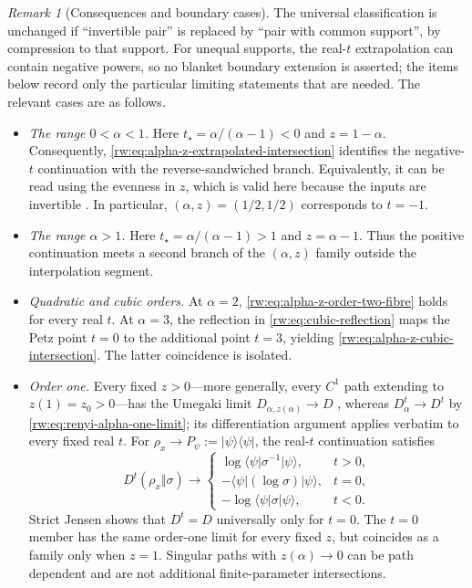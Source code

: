 \documentclass[11pt]{article}
\theoremstyle{remark}
\newtheorem{remark}[remark]{Remark}
\newcommand{\1}{\mathbbm{1}}
\begin{document}
\begin{remark}[Consequences and boundary cases]
\label{rw:rem:alpha-z-boundaries}
The universal classification is unchanged if ``invertible pair'' is
replaced by ``pair with common support'', by compression to that
support.  For unequal supports, the real-$t$ extrapolation can contain
negative powers, so no blanket boundary extension is asserted; the
items below record only the particular limiting statements that are
needed.
The relevant cases are as follows.
\begin{itemize}[leftmargin=1.5em,itemsep=2pt,parsep=0pt,topsep=4pt]
 \item \emph{The range $0<\alpha<1$.}
 Here $t_\star=\alpha/(\alpha-1)<0$ and $z=1-\alpha$.
 Consequently, \eqref{rw:eq:alpha-z-extrapolated-intersection}
 identifies the negative-$t$ continuation with the
 reverse-sandwiched branch.  Equivalently, it can be read using the
 evenness in $z$, which is valid here because the inputs are invertible
 \cite[p.~4, Remark~1]{audenaert2015alphaz}.  In particular,
 $(\alpha,z)=(1/2,1/2)$ corresponds to $t=-1$.

 \item \emph{The range $\alpha>1$.}
 Here $t_\star=\alpha/(\alpha-1)>1$ and $z=\alpha-1$.
 Thus the positive continuation meets a second branch of the
 $(\alpha,z)$ family outside the interpolation segment.

 \item \emph{Quadratic and cubic orders.}
 At $\alpha=2$, \eqref{rw:eq:alpha-z-order-two-fibre} holds for every
 real $t$.  At $\alpha=3$, the reflection in
 \eqref{rw:eq:cubic-reflection} maps the Petz point $t=0$ to the
 additional point $t=3$, yielding
 \eqref{rw:eq:alpha-z-cubic-intersection}.  The latter coincidence is
 isolated.

 \item \emph{Order one.}
 Every fixed $z>0$---more generally, every $C^1$ path extending to
 $z(1)=z_0>0$---has the Umegaki limit
 $D_{\alpha,z(\alpha)}\to D$ \cite[Theorem~4]{lin2015investigating}, whereas
 $D_\alpha^t\to D^t$ by \eqref{rw:eq:renyi-alpha-one-limit}; its
 differentiation argument applies verbatim to every fixed real
 $t$.  For
 $\rho_x\to P_\psi:=\lvert\psi\rangle\!\langle\psi\rvert$, the
 real-$t$ continuation satisfies
 \begin{equation}
  D^t(\rho_x\Vert\sigma)\longrightarrow
  \begin{cases}
   \log\langle\psi\rvert\sigma^{-1}\lvert\psi\rangle,&t>0,\\
   -\langle\psi\rvert(\log\sigma)\lvert\psi\rangle,&t=0,\\
   -\log\langle\psi\rvert\sigma\lvert\psi\rangle,&t<0.
  \end{cases}
  \label{rw:eq:real-t-order-one-pure-limits}
 \end{equation}
 Strict Jensen shows that $D^t=D$ universally only for $t=0$.  The
 $t=0$ member has the same order-one limit for every fixed $z$, but
 coincides as a family only when $z=1$.  Singular paths with
 $z(\alpha)\to0$ can be path dependent
 \cite[Theorems~2--3]{audenaert2015alphaz} and are not additional finite-parameter
 intersections.


\end{itemize}
\end{remark}
\end{document}

